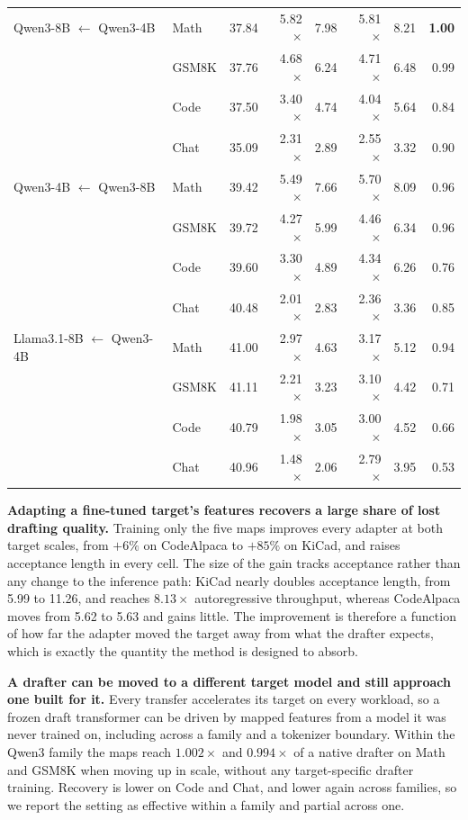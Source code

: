 \begin{table}[t]
\begin{tabular}{llrrrrrr}
Qwen3-8B $\leftarrow$ Qwen3-4B & Math & 37.84 & 5.82$\times$ & 7.98 & 5.81$\times$ & 8.21 & \textbf{1.00} \\
 & GSM8K & 37.76 & 4.68$\times$ & 6.24 & 4.71$\times$ & 6.48 & 0.99 \\
 & Code & 37.50 & 3.40$\times$ & 4.74 & 4.04$\times$ & 5.64 & 0.84 \\
 & Chat & 35.09 & 2.31$\times$ & 2.89 & 2.55$\times$ & 3.32 & 0.90 \\
\addlinespace[1pt]
Qwen3-4B $\leftarrow$ Qwen3-8B & Math & 39.42 & 5.49$\times$ & 7.66 & 5.70$\times$ & 8.09 & 0.96 \\
 & GSM8K & 39.72 & 4.27$\times$ & 5.99 & 4.46$\times$ & 6.34 & 0.96 \\
 & Code & 39.60 & 3.30$\times$ & 4.89 & 4.34$\times$ & 6.26 & 0.76 \\
 & Chat & 40.48 & 2.01$\times$ & 2.83 & 2.36$\times$ & 3.36 & 0.85 \\
\addlinespace[1pt]
Llama3.1-8B $\leftarrow$ Qwen3-4B & Math & 41.00 & 2.97$\times$ & 4.63 & 3.17$\times$ & 5.12 & 0.94 \\
 & GSM8K & 41.11 & 2.21$\times$ & 3.23 & 3.10$\times$ & 4.42 & 0.71 \\
 & Code & 40.79 & 1.98$\times$ & 3.05 & 3.00$\times$ & 4.52 & 0.66 \\
 & Chat & 40.96 & 1.48$\times$ & 2.06 & 2.79$\times$ & 3.95 & 0.53 \\
\bottomrule
\end{tabular}
\setlength{\tabcolsep}{6pt}
\end{table}

\textbf{Adapting a fine-tuned target's features recovers a large share of lost drafting quality.} Training only the five maps improves every adapter at both target scales, from $+6\%$ on CodeAlpaca to $+85\%$ on KiCad, and raises acceptance length in every cell. The size of the gain tracks acceptance rather than any change to the inference path: KiCad nearly doubles acceptance length, from 5.99 to 11.26, and reaches $8.13\times$ autoregressive throughput, whereas CodeAlpaca moves from 5.62 to 5.63 and gains little. The improvement is therefore a function of how far the adapter moved the target away from what the drafter expects, which is exactly the quantity the method is designed to absorb.

\textbf{A drafter can be moved to a different target model and still approach one built for it.} Every transfer accelerates its target on every workload, so a frozen draft transformer can be driven by mapped features from a model it was never trained on, including across a family and a tokenizer boundary. Within the Qwen3 family the maps reach $1.002\times$ and $0.994\times$ of a native drafter on Math and GSM8K when moving up in scale, without any target-specific drafter training. Recovery is lower on Code and Chat, and lower again across families, so we report the setting as effective within a family and partial across one.

